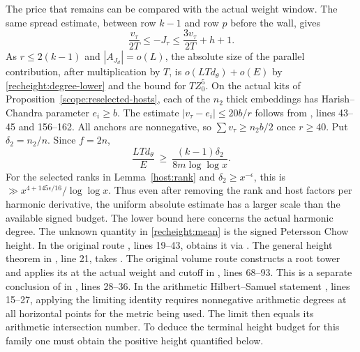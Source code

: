The price that remains can be compared with the actual weight
window. The same spread estimate, between row \(k-1\) and row
\(p\) before the wall, gives
\[
 \frac{v_\tau}{2T}\le -J_\tau
       \le\frac{3v_\tau}{2T}+h+1 .
\]
As \(r\le2(k-1)\) and \(|A_{J_d}|=o(L)\), the absolute size of the
parallel contribution, after multiplication by \(T\), is
\(o(LTd_\theta)+o(E)\) by \eqref{recheight:degree-lower} and the
bound for \(TZ_0^5\). On the actual kits of
Proposition~\ref{scope:reselected-hosts}, each of the \(n_2\) thick
embeddings has Harish--Chandra parameter \(e_i\ge b\). The estimate
\(\lvert v_\tau-e_i\rvert\le20b/r\) follows from
, lines 43--45 and 156--162.
All anchors are nonnegative, so \(\sum v_\tau\ge n_2 b/2\) once
\(r\ge40\). Put \(\delta_2=n_2/n\). Since \(f=2n\),
\[
       \frac{LTd_\theta}{E}
          \ \ge\ \frac{(k-1)\delta_2}{8m\log\log x}.
\]
For the selected ranks in Lemma~\ref{host:rank} and
\(\delta_2\ge x^{-\epsilon}\), this is
\(\gg x^{4+145\epsilon/16}/\log\log x\). Thus even after removing
the rank and host factors per harmonic derivative, the uniform
absolute estimate has a larger scale than the available signed
budget. The lower bound here concerns the actual harmonic degree.
The unknown quantity in \eqref{recheight:mean} is the signed
Petersson Chow height. In the original route
, lines 19--43, obtains it via
. The general height theorem in
, line 21, takes .
The original volume route constructs a root tower and applies its
 at the actual weight and cutoff in
, lines 68--93. This is a separate
conclusion of  in ,
lines 28--36. In the arithmetic Hilbert--Samuel statement
, lines 15--27, applying the limiting
identity requires nonnegative arithmetic degrees at all horizontal
points for the metric being used. The limit then equals its arithmetic
intersection number. To deduce the terminal height budget for this
family one must obtain the positive height quantified below.

